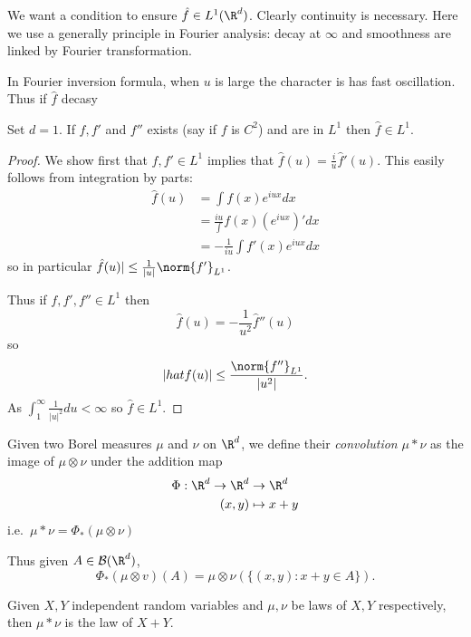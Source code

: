 \documentclass[a4paper]{article}
\begin{document}
We want a condition to ensure \(\hat f \in L^1(\R^d)\). Clearly continuity is necessary. Here we use a generally principle in Fourier analysis: decay at \(\infty\) and smoothness are linked by Fourier transformation.

In Fourier inversion formula, when \(u\) is large the character is has fast oscillation. Thus if \(\hat f\) decasy

\begin{proposition}
  Set \(d = 1\). If \(f, f'\) and \(f''\) exists (say if \(f\) is \(C^2\)) and are in \(L^1\) then \(\hat f \in L^1\).
\end{proposition}

\begin{proof}
  We show first that \(f, f' \in L^1\) implies that \(\hat f(u) = \frac{i}{u} \hat f'(u)\). This easily follows from integration by parts:
  \begin{align*}
    \hat f(u)
    &= \int f(x) e^{iux} dx \\
    &= \frac{iu} \int f(x) (e^{iux})' dx \\
    &= -\frac{1}{iu} \int f'(x) e^{iux} dx
  \end{align*}
  so in particular \(\hat f(u)| \leq \frac{1}{|u|} \norm{f'}_{L^1}\).

  Thus if \(f, f', f'' \in L^1\) then
  \[
    \hat f(u) = - \frac{1}{u^2} \hat f''(u)
  \]
  so
  \[
    |hat f(u)| \leq \frac{\norm{f''}_{L^1}}{|u^2|}.
  \]
  As \(\int_1^\infty \frac{1}{|u|^2} du < \infty\) so \(\hat f \in L^1\).
\end{proof}

\begin{definition}[convolution]
  Given two Borel measures \(\mu\) and \(\nu\) on \(\R^d\), we define their \emph{convolution} \(\mu * \nu\) as the image of \(\mu \otimes \nu\) under the addition map
  \begin{align*}
    \Phi: \R^d \to \R^d &\to \R^d \\
    (x, y) &\mapsto x + y
  \end{align*}
  i.e.\ \(\mu * \nu = \Phi_*(\mu \otimes \nu)\)
\end{definition}

Thus given \(A \in \mathcal B(\R^d)\),
\[
  \Phi_*(\mu \otimes v)(A) = \mu \otimes \nu (\{(x, y): x + y \in A\}).
\]

\begin{eg}
  Given \(X, Y\) independent random variables and \(\mu, \nu\) be laws of \(X, Y\) respectively, then \(\mu * \nu\) is the law of \(X + Y\).
\end{eg}
\end{document}
